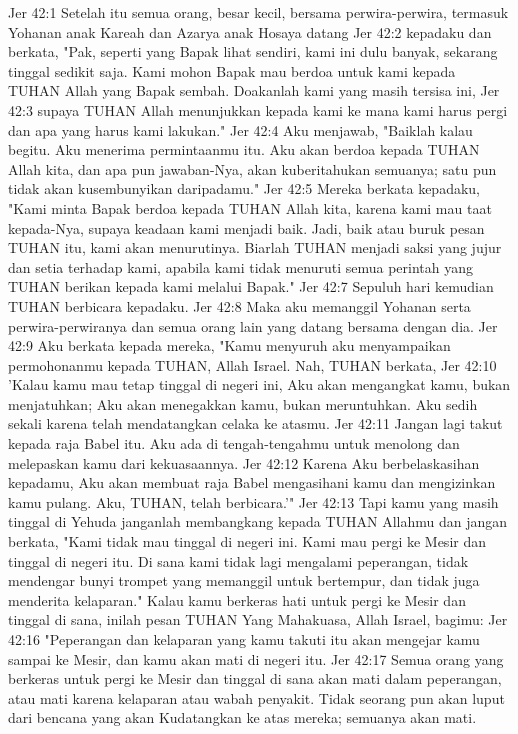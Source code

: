 Jer 42:1  Setelah itu semua orang, besar kecil, bersama perwira-perwira, termasuk Yohanan anak Kareah dan Azarya anak Hosaya datang
Jer 42:2  kepadaku dan berkata, "Pak, seperti yang Bapak lihat sendiri, kami ini dulu banyak, sekarang tinggal sedikit saja. Kami mohon Bapak mau berdoa untuk kami kepada TUHAN Allah yang Bapak sembah. Doakanlah kami yang masih tersisa ini,
Jer 42:3  supaya TUHAN Allah menunjukkan kepada kami ke mana kami harus pergi dan apa yang harus kami lakukan."
Jer 42:4  Aku menjawab, "Baiklah kalau begitu. Aku menerima permintaanmu itu. Aku akan berdoa kepada TUHAN Allah kita, dan apa pun jawaban-Nya, akan kuberitahukan semuanya; satu pun tidak akan kusembunyikan daripadamu."
Jer 42:5  Mereka berkata kepadaku, "Kami minta Bapak berdoa kepada TUHAN Allah kita, karena kami mau taat kepada-Nya, supaya keadaan kami menjadi baik. Jadi, baik atau buruk pesan TUHAN itu, kami akan menurutinya. Biarlah TUHAN menjadi saksi yang jujur dan setia terhadap kami, apabila kami tidak menuruti semua perintah yang TUHAN berikan kepada kami melalui Bapak."
Jer 42:7  Sepuluh hari kemudian TUHAN berbicara kepadaku.
Jer 42:8  Maka aku memanggil Yohanan serta perwira-perwiranya dan semua orang lain yang datang bersama dengan dia.
Jer 42:9  Aku berkata kepada mereka, "Kamu menyuruh aku menyampaikan permohonanmu kepada TUHAN, Allah Israel. Nah, TUHAN berkata,
Jer 42:10  'Kalau kamu mau tetap tinggal di negeri ini, Aku akan mengangkat kamu, bukan menjatuhkan; Aku akan menegakkan kamu, bukan meruntuhkan. Aku sedih sekali karena telah mendatangkan celaka ke atasmu.
Jer 42:11  Jangan lagi takut kepada raja Babel itu. Aku ada di tengah-tengahmu untuk menolong dan melepaskan kamu dari kekuasaannya.
Jer 42:12  Karena Aku berbelaskasihan kepadamu, Aku akan membuat raja Babel mengasihani kamu dan mengizinkan kamu pulang. Aku, TUHAN, telah berbicara.'"
Jer 42:13  Tapi kamu yang masih tinggal di Yehuda janganlah membangkang kepada TUHAN Allahmu dan jangan berkata, "Kami tidak mau tinggal di negeri ini. Kami mau pergi ke Mesir dan tinggal di negeri itu. Di sana kami tidak lagi mengalami peperangan, tidak mendengar bunyi trompet yang memanggil untuk bertempur, dan tidak juga menderita kelaparan." Kalau kamu berkeras hati untuk pergi ke Mesir dan tinggal di sana, inilah pesan TUHAN Yang Mahakuasa, Allah Israel, bagimu:
Jer 42:16  "Peperangan dan kelaparan yang kamu takuti itu akan mengejar kamu sampai ke Mesir, dan kamu akan mati di negeri itu.
Jer 42:17  Semua orang yang berkeras untuk pergi ke Mesir dan tinggal di sana akan mati dalam peperangan, atau mati karena kelaparan atau wabah penyakit. Tidak seorang pun akan luput dari bencana yang akan Kudatangkan ke atas mereka; semuanya akan mati.
